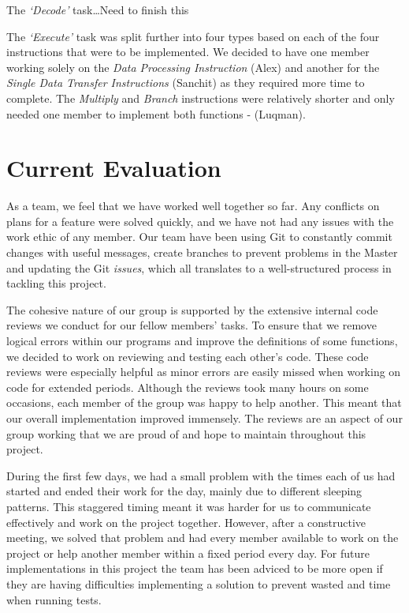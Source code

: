 \documentclass[10pt]{article}
\begin{document}
The \textsl{‘Decode’} task…Need to finish this


The \textsl{‘Execute’} task was split further into four types based on each of the four instructions that were to be
implemented. We decided to have one member working solely on the \textsl{Data Processing Instruction} (Alex) and another
for the \textsl{Single Data Transfer Instructions} (Sanchit) as they required more time to complete. The \textsl{Multiply} and \textsl{Branch}
instructions were relatively shorter and only needed one member to implement both functions - (Luqman).

\section*{Current Evaluation}
As a team, we feel that we have worked well together so far. Any conflicts on plans for a feature were solved
quickly, and we have not had any issues with the work ethic of any member. Our team have been using Git to
constantly commit changes with useful messages, create branches to prevent problems in the Master and
updating the Git \textsl{issues}, which all translates to a well-structured process in tackling this project.


The cohesive nature of our group is supported by the extensive internal code reviews we conduct for our
fellow members’ tasks. To ensure that we remove logical errors within our programs and improve the
definitions of some functions, we decided to work on reviewing and testing each other’s code. These code
reviews were especially helpful as minor errors are easily missed when working on code for extended periods.
Although the reviews took many hours on some occasions, each member of the group was happy to help
another. This meant that our overall implementation improved immensely. The reviews are an aspect of our
group working that we are proud of and hope to maintain throughout this project.


During the first few days, we had a small problem with the times each of us had started and ended their work
for the day, mainly due to different sleeping patterns. This staggered timing meant it was harder for us to
communicate effectively and work on the project together. However, after a constructive meeting, we solved
that problem and had every member available to work on the project or help another member within a fixed
period every day. For future implementations in this project the team has been adviced to be more open if they
are having difficulties implementing a solution to prevent wasted and time when running tests. 
\end{document}
